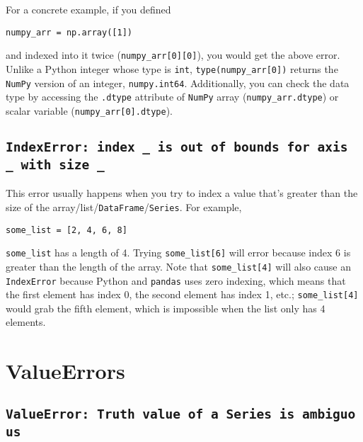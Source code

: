 \documentclass[
  letterpaper,
  DIV=11,
  numbers=noendperiod]{scrreprt}
\begin{document}
For a concrete example, if you defined

\begin{verbatim}
numpy_arr = np.array([1])
\end{verbatim}

and indexed into it twice (\texttt{numpy\_arr{[}0{]}{[}0{]}}), you would
get the above error. Unlike a Python integer whose type is \texttt{int},
\texttt{type(numpy\_arr{[}0{]})} returns the \texttt{NumPy} version of
an integer, \texttt{numpy.int64}. Additionally, you can check the data
type by accessing the \texttt{.dtype} attribute of \texttt{NumPy} array
(\texttt{numpy\_arr.dtype}) or scalar variable
(\texttt{numpy\_arr{[}0{]}.dtype}).

\subsection{\texorpdfstring{\texttt{IndexError:\ index\ \_\ is\ out\ of\ bounds\ for\ axis\ \_\ with\ size\ \_}}{IndexError: index \_ is out of bounds for axis \_ with size \_}}\label{indexerror-index-_-is-out-of-bounds-for-axis-_-with-size-_}

This error usually happens when you try to index a value that's greater
than the size of the array/list/\texttt{DataFrame}/\texttt{Series}. For
example,

\begin{verbatim}
some_list = [2, 4, 6, 8]
\end{verbatim}

\texttt{some\_list} has a length of 4. Trying \texttt{some\_list{[}6{]}}
will error because index 6 is greater than the length of the array. Note
that \texttt{some\_list{[}4{]}} will also cause an \texttt{IndexError}
because Python and \texttt{pandas} uses zero indexing, which means that
the first element has index 0, the second element has index 1, etc.;
\texttt{some\_list{[}4{]}} would grab the fifth element, which is
impossible when the list only has 4 elements.

\section{ValueErrors}\label{valueerrors}

\subsection{\texorpdfstring{\texttt{ValueError:\ Truth\ value\ of\ a\ Series\ is\ ambiguous}}{ValueError: Truth value of a Series is ambiguous}}\label{valueerror-truth-value-of-a-series-is-ambiguous}
\end{document}
